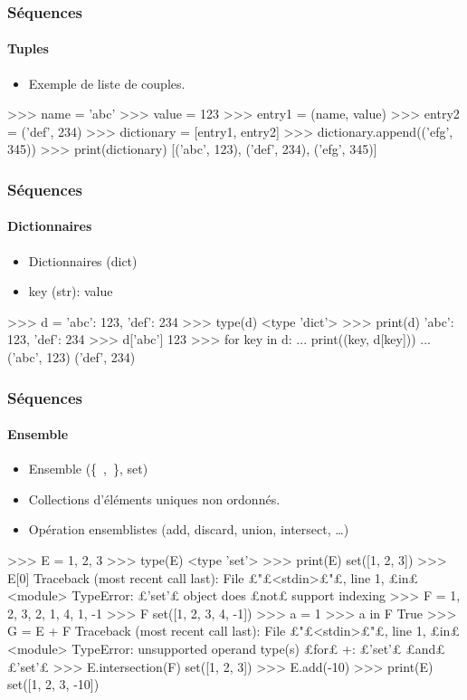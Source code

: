\begin{frame}[fragile]
\frametitle{Séquences}
\framesubtitle{Tuples}
\begin{itemize}
 \item Exemple de liste de couples. 
\end{itemize}
\begin{pythonConsole}
>>> name = 'abc'
>>> value = 123
>>> entry1 = (name, value)
>>> entry2 = ('def', 234)
>>> dictionary = [entry1, entry2]
>>> dictionary.append(('efg', 345))
>>> print(dictionary)
[('abc', 123), ('def', 234), ('efg', 345)]
\end{pythonConsole}
\end{frame}
\begin{frame}[fragile]
\frametitle{Séquences}
\framesubtitle{Dictionnaires}
\begin{itemize}
 \item Dictionnaires (dict) 
 \item key (str): value 
\end{itemize}
\begin{pythonConsole}
>>> d = {'abc': 123, 'def': 234}
>>> type(d)
<type 'dict'>
>>> print(d)
{'abc': 123, 'def': 234}
>>> d['abc']
123
>>> for key in d: 
...  print((key, d[key]))
... 
('abc', 123)
('def', 234)
\end{pythonConsole}
\end{frame}
\begin{frame}[fragile]
\frametitle{Séquences}
\framesubtitle{Ensemble}
\begin{itemize}
 \item Ensemble (\{\ ,\ \}, set) 
 \item Collections d'éléments uniques non ordonnés.
 \item Opération ensemblistes (add, discard, union, intersect, \dots)
\end{itemize}
\begin{pythonConsole}
>>> E = {1, 2, 3}
>>> type(E)
<type 'set'>
>>> print(E)
set([1, 2, 3])
>>> E[0]
Traceback (most recent call last):
  File £"£<stdin>£"£, line 1, £in£ <module>
TypeError: £'set'£ object does £not£ support indexing
>>> F = {1, 2, 3, 2, 1, 4, 1, -1}
>>> F
set([1, 2, 3, 4, -1])
>>> a = 1
>>> a in F
True
>>> G = E + F
Traceback (most recent call last):
  File £"£<stdin>£"£, line 1, £in£ <module>
TypeError: unsupported operand type(s) £for£ +: £'set'£ £and£ £'set'£
>>> E.intersection(F)
set([1, 2, 3]) 
>>> E.add(-10)
>>> print(E)
set([1, 2, 3, -10])
\end{pythonConsole}
\end{frame}
